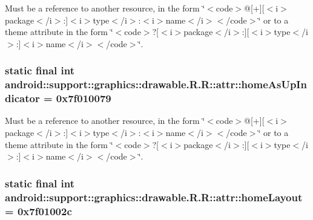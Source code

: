 Must be a reference to another resource, in the form \char`\"{}$<$code$>$@\mbox{[}+\mbox{]}\mbox{[}$<$i$>$package$<$/i$>$:\mbox{]}$<$i$>$type$<$/i$>$:$<$i$>$name$<$/i$>$$<$/code$>$\char`\"{} or to a theme attribute in the form \char`\"{}$<$code$>$?\mbox{[}$<$i$>$package$<$/i$>$:\mbox{]}\mbox{[}$<$i$>$type$<$/i$>$:\mbox{]}$<$i$>$name$<$/i$>$$<$/code$>$\char`\"{}. \hypertarget{classandroid_1_1support_1_1graphics_1_1drawable_1_1_r_1_1attr_44c266e4dc49ebe1c976cd67cede1a62}{
\subsubsection[{homeAsUpIndicator}]{\setlength{\rightskip}{0pt plus 5cm}static final int android::support::graphics::drawable.R.R::attr::homeAsUpIndicator = 0x7f010079}}
\label{classandroid_1_1support_1_1graphics_1_1drawable_1_1_r_1_1attr_44c266e4dc49ebe1c976cd67cede1a62}


Must be a reference to another resource, in the form \char`\"{}$<$code$>$@\mbox{[}+\mbox{]}\mbox{[}$<$i$>$package$<$/i$>$:\mbox{]}$<$i$>$type$<$/i$>$:$<$i$>$name$<$/i$>$$<$/code$>$\char`\"{} or to a theme attribute in the form \char`\"{}$<$code$>$?\mbox{[}$<$i$>$package$<$/i$>$:\mbox{]}\mbox{[}$<$i$>$type$<$/i$>$:\mbox{]}$<$i$>$name$<$/i$>$$<$/code$>$\char`\"{}. \hypertarget{classandroid_1_1support_1_1graphics_1_1drawable_1_1_r_1_1attr_a200d94128dc235bd51e497a5129b576}{
\subsubsection[{homeLayout}]{\setlength{\rightskip}{0pt plus 5cm}static final int android::support::graphics::drawable.R.R::attr::homeLayout = 0x7f01002c}}
\label{classandroid_1_1support_1_1graphics_1_1drawable_1_1_r_1_1attr_a200d94128dc235bd51e497a5129b576}


